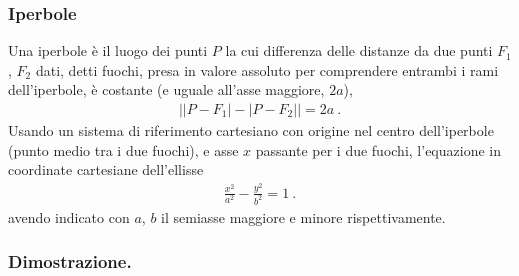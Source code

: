 \documentclass[letterpaper,10pt,english]{jupyterBook}
\begin{document}
\subsubsection{Iperbole}
\label{\detokenize{ch/analytic_geometry/analytic_geometry_2d/conics-cartesian:iperbole}}
\sphinxAtStartPar
Una iperbole è il luogo dei punti \(P\) la cui differenza delle distanze da due punti \(F_1\), \(F_2\) dati, detti fuochi, presa in valore assoluto per comprendere entrambi i rami dell’iperbole, è costante (e uguale all’asse maggiore, \(2 a\)),
\begin{equation*}
\begin{split}\big| |P - F_1| - |P - F_2| \big| = 2 a \ .\end{split}
\end{equation*}
\sphinxAtStartPar
Usando un sistema di riferimento cartesiano con origine nel centro dell’iperbole (punto medio tra i due fuochi), e asse \(x\) passante per i due fuochi, l’equazione in coordinate cartesiane dell’ellisse
\begin{equation*}
\begin{split}\frac{x^2}{a^2} - \frac{y^2}{b^2} = 1 \ .\end{split}
\end{equation*}
\sphinxAtStartPar
avendo indicato con \(a\), \(b\) il semiasse maggiore e minore rispettivamente.
\subsubsection*{Dimostrazione.}
\end{document}

